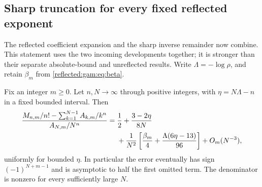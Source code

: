 \subsection{Sharp truncation for every fixed reflected exponent}
The reflected coefficient expansion and the sharp inverse remainder now
combine. This statement uses the two incoming developments together;
it is stronger than their separate absolute-bound and unreflected results.
Write $\Lambda=-\log\rho$, and retain $\beta_m$ from
\eqref{reflected:gam:eq:beta}.

\begin{corollary}
\label{reflected:cor:sharp}
Fix an integer $m\ge0$. Let $n,N\to\infty$ through positive integers,
with $\eta=N\Lambda-n$ in a fixed bounded interval. Then
\begin{align}\label{reflected:eq:sharp}
 \frac{M_{n,m}/n!-\sum_{k=1}^{N-1}A_{k,m}/k^n}{A_{N,m}/N^n}
 ={}&\frac12+\frac{3-2\eta}{8N}\notag\\
 &+\frac1{N^2}\left[\frac{\beta_m}{4}
       +\frac{\Lambda(6\eta-13)}{96}\right]+O_m(N^{-3}),
\end{align}
uniformly for bounded $\eta$. In particular the error eventually has
sign $(-1)^{N+m-1}$ and is asymptotic to half the first omitted term.
The denominator is nonzero for every sufficiently large $N$.
\end{corollary}
